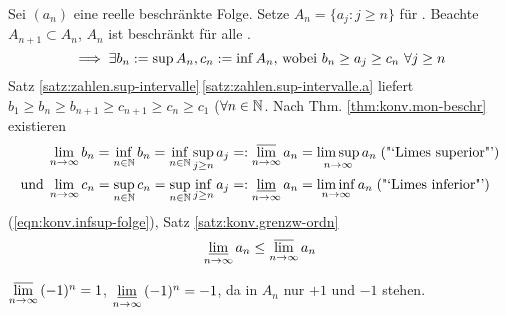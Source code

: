 \documentclass[12pt]{scrreprt}
\begin{document}
\noindent Sei $(a_n)$ eine reelle beschränkte Folge. Setze $A_n=\{a_j:j\ge n\}$ für . Beachte $A_{n+1}\subset A_n$, $A_n$ ist beschränkt für alle .
\begin{equation} \label{eqn:konv.infsup-folge}
\implies \exists b_n:=\sup{A_n}, c_n:=\inf{A_n}\text{, wobei } b_n \ge a_j \ge c_n \ \forall j \ge n
\end{equation}
Satz \ref{satz:zahlen.sup-intervalle}\,\ref{satz:zahlen.sup-intervalle.a} liefert $b_1 \ge b_n \ge b_{n+1} \ge c_{n+1} \ge c_n \ge c_1$ ($\forall n\in\mathbb{N}$. Nach Thm. \ref{thm:konv.mon-beschr} existieren
\begin{equation} \begin{split} \label{eqn:konv.def-limsupinf}
\lim_{n\rightarrow\infty}{b_n} = \inf_{n\in\mathbb{N}}{b_n} = \inf_{n\in\mathbb{N}}{\sup_{j\ge n}{a_j}} &=: \varlimsup_{n\rightarrow\infty}{a_n} = \limsup_{n\rightarrow\infty}{a_n}\;\text{("`Limes superior"')}\\
\text{und}\;
\lim_{n\rightarrow\infty}{c_n} = \sup_{n\in\mathbb{N}}{c_n} = \sup_{n\in\mathbb{N}}{\inf_{j\ge n}{a_j}} &=: \varliminf_{n\rightarrow\infty}{a_n} = \liminf_{n\rightarrow\infty}{a_n}\;\text{("`Limes inferior"')}\\
\end{split} \end{equation}
(\ref{eqn:konv.infsup-folge}), Satz \ref{satz:konv.grenzw-ordn} \folgt \begin{equation} \label{eqn:konv.ordn-limsupinf} \varliminf_{n\rightarrow\infty}{a_n}\le\varlimsup_{n\rightarrow\infty}{a_n} \end{equation}
\begin{bsp*}
$\varlimsup\limits_{n\rightarrow\infty}{(-1)^n}=1$, $\varliminf\limits_{n\rightarrow\infty}{(-1)^n}=-1$, da in $A_n$ nur $+1$ und $-1$ stehen.
\end{bsp*}
\end{document}
